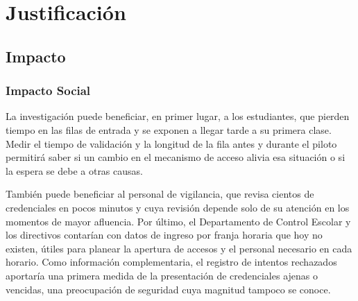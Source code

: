 %
\ifdefined\solojustificacion
\let\justsec\section
\let\justsubsec\subsection
\else
\section{Justificación}
\let\justsec\subsection
\let\justsubsec\subsubsection
\fi

\justsec{Impacto}

\justsubsec{Impacto Social}
La investigación puede beneficiar, en primer lugar, a los estudiantes, que
pierden tiempo en las filas de entrada y se exponen a llegar tarde a su
primera clase. Medir el tiempo de validación y la longitud de la fila antes
y durante el piloto permitirá saber si un cambio en el mecanismo de acceso
alivia esa situación o si la espera se debe a otras causas.

También puede beneficiar al personal de vigilancia, que revisa cientos de
credenciales en pocos minutos y cuya revisión depende solo de su atención en
los momentos de mayor afluencia. Por último, el Departamento de Control
Escolar y los directivos contarían con datos de ingreso por franja horaria
que hoy no existen, útiles para planear la apertura de accesos y el personal
necesario en cada horario. Como información complementaria, el registro de
intentos rechazados aportaría una primera medida de la presentación de
credenciales ajenas o vencidas, una preocupación de seguridad cuya magnitud
tampoco se conoce.

